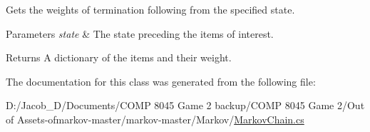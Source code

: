 Gets the weights of termination following from the specified state. 


\begin{DoxyParams}{Parameters}
{\em state} & The state preceding the items of interest.\\
\hline
\end{DoxyParams}
\begin{DoxyReturn}{Returns}
A dictionary of the items and their weight.
\end{DoxyReturn}


The documentation for this class was generated from the following file\+:\begin{DoxyCompactItemize}
\item 
D\+:/\+Jacob\+\_\+\+D/\+Documents/\+C\+O\+M\+P 8045 Game 2 backup/\+C\+O\+M\+P 8045 Game 2/\+Out of Assets-\/ofmarkov-\/master/markov-\/master/\+Markov/\mbox{\hyperlink{_markov_chain_8cs}{Markov\+Chain.\+cs}}\end{DoxyCompactItemize}
